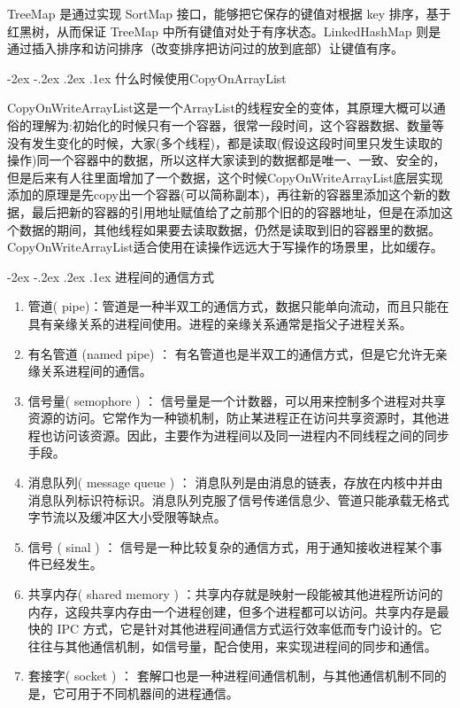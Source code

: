 \documentclass[8pt]{book}
\makeatletter
\numberwithin{dummy}{section}
\theoremstyle{ocrenumbox}
\theoremstyle{blacknumex}
\theoremstyle{blacknumbox}
\theoremstyle{ocrenum}
\renewcommand\paragraph{\@startsection{paragraph}{4}{\z@}
	{-2ex \@plus-.2ex \@minus .2ex}
	{.1ex}
	{\normalfont\small\sffamily\bfseries}}
\makeatother
\begin{document}
TreeMap 是通过实现 SortMap 接口，能够把它保存的键值对根据 key 排序，基于红黑树，从而保证 TreeMap 中所有键值对处于有序状态。LinkedHashMap 则是通过插入排序和访问排序（改变排序把访问过的放到底部）让键值有序。

\paragraph{什么时候使用CopyOnArrayList}

CopyOnWriteArrayList这是一个ArrayList的线程安全的变体，其原理大概可以通俗的理解为:初始化的时候只有一个容器，很常一段时间，这个容器数据、数量等没有发生变化的时候，大家(多个线程)，都是读取(假设这段时间里只发生读取的操作)同一个容器中的数据，所以这样大家读到的数据都是唯一、一致、安全的，但是后来有人往里面增加了一个数据，这个时候CopyOnWriteArrayList底层实现添加的原理是先copy出一个容器(可以简称副本)，再往新的容器里添加这个新的数据，最后把新的容器的引用地址赋值给了之前那个旧的的容器地址，但是在添加这个数据的期间，其他线程如果要去读取数据，仍然是读取到旧的容器里的数据。CopyOnWriteArrayList适合使用在读操作远远大于写操作的场景里，比如缓存。

\paragraph{进程间的通信方式}

\begin{enumerate}
\item {管道( pipe)：管道是一种半双工的通信方式，数据只能单向流动，而且只能在具有亲缘关系的进程间使用。进程的亲缘关系通常是指父子进程关系。}
\item{有名管道 (named pipe) ： 有名管道也是半双工的通信方式，但是它允许无亲缘关系进程间的通信。}
\item{信号量( semophore ) ： 信号量是一个计数器，可以用来控制多个进程对共享资源的访问。它常作为一种锁机制，防止某进程正在访问共享资源时，其他进程也访问该资源。因此，主要作为进程间以及同一进程内不同线程之间的同步手段。}
\item{消息队列( message queue ) ： 消息队列是由消息的链表，存放在内核中并由消息队列标识符标识。消息队列克服了信号传递信息少、管道只能承载无格式字节流以及缓冲区大小受限等缺点。}
\item{信号 ( sinal ) ： 信号是一种比较复杂的通信方式，用于通知接收进程某个事件已经发生。}
\item{共享内存( shared memory ) ：共享内存就是映射一段能被其他进程所访问的内存，这段共享内存由一个进程创建，但多个进程都可以访问。共享内存是最快的 IPC 方式，它是针对其他进程间通信方式运行效率低而专门设计的。它往往与其他通信机制，如信号量，配合使用，来实现进程间的同步和通信。}
\item{套接字( socket ) ： 套解口也是一种进程间通信机制，与其他通信机制不同的是，它可用于不同机器间的进程通信。}
\end{enumerate}
\end{document}
